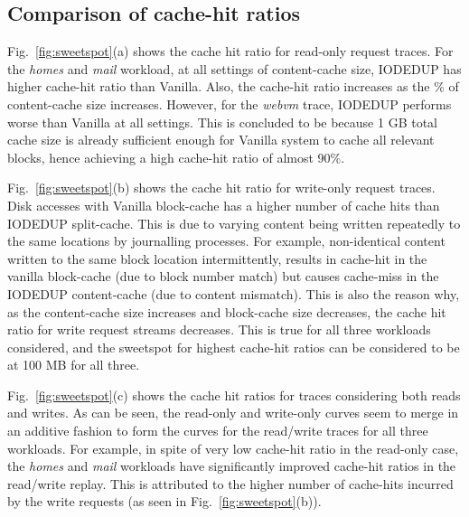 \subsection{Comparison of cache-hit ratios}

Fig.~\ref{fig:sweetspot}(a) shows the cache hit ratio for read-only
request traces.
For the \textit{homes} and \textit{mail} workload,
at all settings of content-cache size,
IODEDUP has higher cache-hit ratio than Vanilla. Also, the cache-hit
ratio increases as the \% of content-cache size increases.
However, for the \textit{webvm} trace,
IODEDUP performs worse than Vanilla at all settings. This
is concluded to be because
1 GB total cache size is
already sufficient enough for Vanilla system to cache all relevant
blocks, hence achieving a high cache-hit ratio of almost 90\%.

Fig.~\ref{fig:sweetspot}(b) shows the cache hit ratio for write-only
request traces. Disk accesses with Vanilla block-cache has
a higher number of cache hits than IODEDUP split-cache. 
This is due to varying content being written repeatedly to the same
locations by journalling processes.
For example, non-identical content written to the same block location
intermittently,
results in cache-hit in the vanilla block-cache (due to block number match)
but causes cache-miss in the IODEDUP content-cache (due to content mismatch).
This is also the reason why,
as the content-cache size increases and block-cache size decreases, the
cache hit ratio for write request streams decreases. This is true for
all three workloads considered, and the sweetspot for highest cache-hit
ratios can be considered to be at 100 MB for all three.



Fig.~\ref{fig:sweetspot}(c) shows the cache hit ratios
for traces considering both reads and writes. As can be seen,
the read-only and write-only curves seem to merge in an additive fashion
to form the curves for the read/write traces for all three workloads.
For example, in spite of very low cache-hit ratio in the read-only case,
the \textit{homes} and \textit{mail} workloads have significantly improved
cache-hit ratios in the read/write replay. This is attributed to the
higher number of cache-hits incurred by the write requests (as seen in
Fig.~\ref{fig:sweetspot}(b)).


